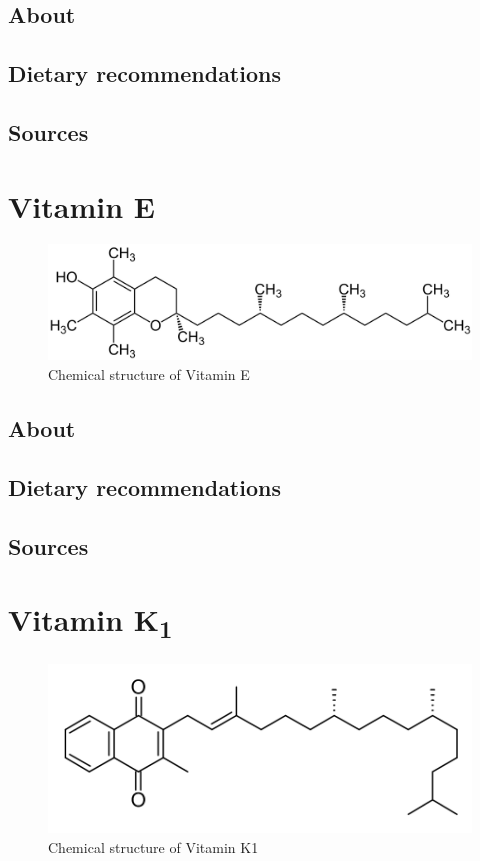 \documentclass{book}
\begin{document}
\section{About}


\section{Dietary recommendations}


\section{Sources}


\chapter{Vitamin E}
\begin{figure}[h]
	\caption{Chemical structure of Vitamin E}
	\centering \includegraphics[width=\textwidth]{images/Vitamin_E_chemical_structure}
\end{figure}
\newpage

\section{About}


\section{Dietary recommendations}


\section{Sources}


\chapter{Vitamin K\textsubscript{1}}
\begin{figure}[h]
	\caption{Chemical structure of Vitamin K1}
	\centering \includegraphics[width=\textwidth]{images/Vitamin_K1_chemical_structure}
\end{figure}
\newpage
\end{document}
